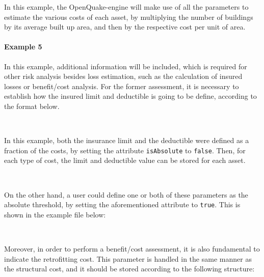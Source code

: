 In this example, the OpenQuake-engine will make use of all the parameters to
estimate the various costs of each asset, by multiplying the number of
buildings by its average built up area, and then by the respective cost per
unit of area.


\paragraph{Example 5}

In this example, additional information will be included, which is required
for other risk analysis besides loss estimation, such as the calculation of
insured losses or benefit/cost analysis. For the former assessment, it is
necessary to establish how the insured limit and deductible is going to be
define, according to the format below.

\inputminted[firstline=8,firstnumber=8,lastline=21,fontsize=\footnotesize,frame=single,linenos,bgcolor=lightgray]{xml}{oqum/risk/Verbatim/input_exposure_ins_rel.xml}\\

In this example, both the insurance limit and the deductible were defined as a
fraction of the costs, by setting the attribute \Verb+isAbsolute+ to
\Verb+false+. Then, for each type of cost, the limit and deductible value
can be stored for each asset.

\inputminted[firstline=22,firstnumber=22,lastline=32,fontsize=\footnotesize,frame=single,linenos,bgcolor=lightgray]{xml}{oqum/risk/Verbatim/input_exposure_ins_rel.xml}\\

On the other hand, a user could define one or both of these parameters as the
absolute threshold, by setting the aforementioned attribute to \Verb+true+.
This is shown in the example file below:

\inputminted[firstline=1,firstnumber=1,fontsize=\footnotesize,frame=single,linenos,bgcolor=lightgray]{xml}{oqum/risk/Verbatim/input_exposure_ins_abs.xml}\\

Moreover, in order to perform a benefit/cost
assessment, it is also fundamental to indicate the retrofitting cost. This
parameter is handled in the same manner as the structural cost, and it should
be stored according to the following structure:

\inputminted[firstline=1,firstnumber=1,fontsize=\footnotesize,frame=single,linenos,bgcolor=lightgray]{xml}{oqum/risk/Verbatim/input_exposure_retrofit.xml}\\

